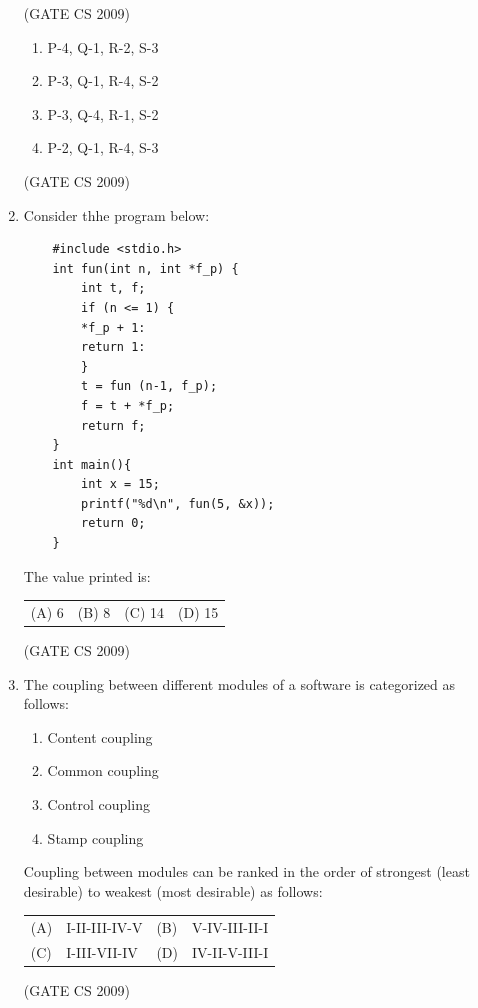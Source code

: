 \documentclass[a4paper, 11pt]{article}
\begin{document}
\begin{enumerate}
    \hfill (GATE CS 2009)
    
    \begin{enumerate}[label=(\Alph*)]
        \item P-4, Q-1, R-2, S-3
        \item P-3, Q-1, R-4, S-2 
        \item P-3, Q-4, R-1, S-2
        \item P-2, Q-1, R-4, S-3
    \end{enumerate}

    \hfill (GATE CS 2009)

    \item Consider thhe program below:
    \begin{lstlisting}
    #include <stdio.h>
    int fun(int n, int *f_p) {
        int t, f;
        if (n <= 1) {
        *f_p + 1:
        return 1:
        }
        t = fun (n-1, f_p);
        f = t + *f_p;
        return f;
    }
    int main(){
        int x = 15;
        printf("%d\n", fun(5, &x));
        return 0;
    }
    \end{lstlisting}
    The value printed is:\\
    \begin{tabularx}{\textwidth}{@{}XXXX@{}}
    (A) 6 & (B) 8 & (C) 14 & (D) 15
    \end{tabularx}

    \hfill (GATE CS 2009)

    \item The coupling between different modules of a software is categorized as follows:
    \begin{enumerate}[label=\Roman*]
        \item Content coupling
        \item Common coupling 
        \item Control coupling
        \item Stamp coupling
    \end{enumerate}
    Coupling between modules can be ranked in the order of strongest (least desirable) to weakest (most desirable) as follows:\\
    \begin{tabularx}{\textwidth}{@{}lX lX@{}}
    (A) & I-II-III-IV-V  & (B) & V-IV-III-II-I  \\
    (C) & I-III-VII-IV & (D) & IV-II-V-III-I
    \end{tabularx}

    \hfill (GATE CS 2009)


\end{enumerate}
\end{document}
